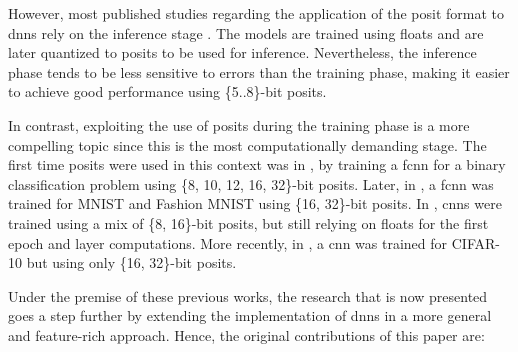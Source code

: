 \documentclass{article}
\begin{document}
	
	However, most published studies regarding the application of the posit format to \glspl{dnn} rely on the inference stage \cite{Cococcioni2018, Johnson2018, Langroudi2018, Carmichael2019, Carmichael2019a, Langroudi2019, Langroudi2020}. The models are trained using floats and are later quantized to posits to be used for inference. Nevertheless, the inference phase tends to be less sensitive to errors than the training phase, making it easier to achieve good performance using \{5..8\}-bit posits.
	
	In contrast, exploiting the use of posits during the training phase is a more compelling topic since this is the most computationally demanding stage. The first time posits were used in this context was in \cite{Montero2019}, by training a \gls{fcnn} for a binary classification problem using \{8, 10, 12, 16, 32\}-bit posits. Later, in \cite{Langroudi2019b, Langroudi2019a}, a \gls{fcnn} was trained for MNIST and Fashion MNIST using \{16, 32\}-bit posits. In \cite{Lu2019, Lu2020}, \glspl{cnn} were trained using a mix of \{8, 16\}-bit posits, but still relying on floats for the first epoch and layer computations. More recently, in \cite{Murillo2020}, a \gls{cnn} was trained for CIFAR-10 but using only \{16, 32\}-bit posits.
	
	
	
	
	Under the premise of these previous works, the research that is now presented goes a step further by extending the implementation of \glspl{dnn} in a more general and feature-rich approach. Hence, the original contributions of this paper are:
	
\end{document}

